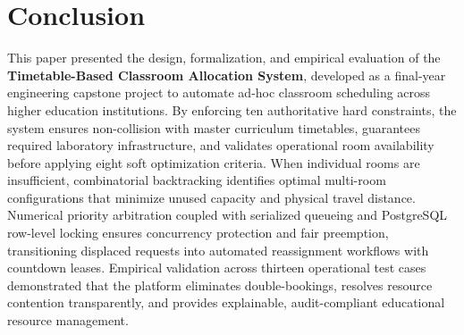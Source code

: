 \documentclass[conference]{IEEEtran}
\begin{document}
\section{Conclusion}
This paper presented the design, formalization, and empirical evaluation of the \textbf{Timetable-Based Classroom Allocation System}, developed as a final-year engineering capstone project to automate ad-hoc classroom scheduling across higher education institutions. By enforcing ten authoritative hard constraints, the system ensures non-collision with master curriculum timetables, guarantees required laboratory infrastructure, and validates operational room availability before applying eight soft optimization criteria. When individual rooms are insufficient, combinatorial backtracking identifies optimal multi-room configurations that minimize unused capacity and physical travel distance. Numerical priority arbitration coupled with serialized queueing and PostgreSQL row-level locking ensures concurrency protection and fair preemption, transitioning displaced requests into automated reassignment workflows with countdown leases. Empirical validation across thirteen operational test cases demonstrated that the platform eliminates double-bookings, resolves resource contention transparently, and provides explainable, audit-compliant educational resource management.
\end{document}
